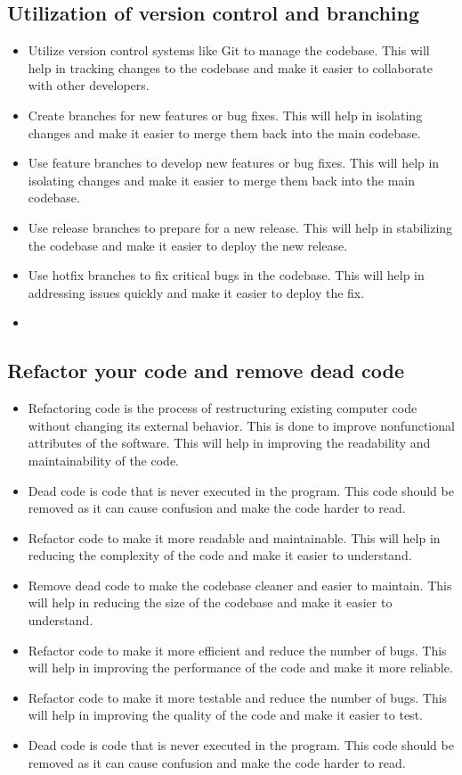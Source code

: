 \documentclass{article}
\begin{document}
\subsection*{Utilization of version control and branching}
\begin{itemize}
    \item Utilize version control systems like Git to manage the codebase. This will help in tracking changes to the codebase and make it easier to collaborate with other developers.
    \item Create branches for new features or bug fixes. This will help in isolating changes and make it easier to merge them back into the main codebase.
    \item Use feature branches to develop new features or bug fixes. This will help in isolating changes and make it easier to merge them back into the main codebase.
    \item Use release branches to prepare for a new release. This will help in stabilizing the codebase and make it easier to deploy the new release.
    \item Use hotfix branches to fix critical bugs in the codebase. This will help in addressing issues quickly and make it easier to deploy the fix.
    \item 
\end{itemize}
\subsection*{Refactor your code and remove dead code}
\begin{itemize}
    \item Refactoring code is the process of restructuring existing computer code without changing its external behavior. This is done to improve nonfunctional attributes of the software. This will help in improving the readability and maintainability of the code.
    \item Dead code is code that is never executed in the program. This code should be removed as it can cause confusion and make the code harder to read.
    \item Refactor code to make it more readable and maintainable. This will help in reducing the complexity of the code and make it easier to understand.
    \item Remove dead code to make the codebase cleaner and easier to maintain. This will help in reducing the size of the codebase and make it easier to understand.
    \item Refactor code to make it more efficient and reduce the number of bugs. This will help in improving the performance of the code and make it more reliable.
    \item Refactor code to make it more testable and reduce the number of bugs. This will help in improving the quality of the code and make it easier to test.
    \item Dead code is code that is never executed in the program. This code should be removed as it can cause confusion and make the code harder to read.
\end{itemize}
\end{document}
